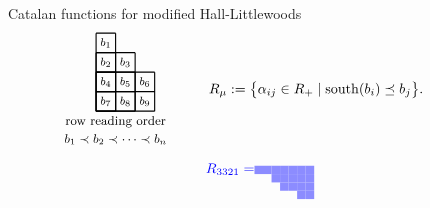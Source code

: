 \documentclass[dvipsnames]{beamer}
\newcommand{\south}{{\mathrm{south}}}
\theoremstyle{definition}
\newcommand{\qtrootcolor}{blue!45}
\newcommand{\colorb}[1]{\textcolor{blue}{#1}}
\begin{document}
\begin{frame}{Catalan functions for modified Hall-Littlewoods}
\begin{align*}
\quad \ \ \
\begin{tikzpicture}[scale = .49]
\begin{scope}
\draw[thick] (0,0) grid (1,4);
\draw[thick] (0,0) grid (2,3);
\draw[thick] (0,0) grid (3,2);
\node at (0.5, 3.5) { \footnotesize $b_1$};
\node at (0.5, 2.5) { \footnotesize $b_2$};
\node at (1.5, 2.5) { \footnotesize $b_3$};
\node at (0.5, 1.5) { \footnotesize $b_4$};
\node at (1.5, 1.5) { \footnotesize $b_5$};
\node at (2.5, 1.5) { \footnotesize $b_6$};
\node at (0.5, 0.5) { \footnotesize $b_7$};
\node at (1.5, 0.5) { \footnotesize $b_8$};
\node at (2.5, 0.5) { \footnotesize $b_9$};
\node at (1,-.54) {\small row reading order };
\node at (1,-1.44) {\small $b_1 \prec b_2 \prec \cdots  \prec b_n$};
\end{scope}
\end{tikzpicture}
\quad  \quad \ \
\raisebox{14mm}{\parbox{7cm}{
$R_\mu  :=  \big\{ \alpha_{ij} \in R_+ \mid  \south(b_i) \preceq b_j \big\}$.}}
\end{align*}
\vspace{-1cm}
\begin{align*}
\raisebox{6.7mm}{$\colorb{R_{3321} = }$}
\begin{tikzpicture}[scale=.213]
\draw[draw = none, fill = \qtrootcolor] (2,-1) rectangle (3,-2);
 \draw[draw = none, fill = \qtrootcolor] (3,-1) rectangle (4,-2);
 \draw[draw = none, fill = \qtrootcolor] (4,-1) rectangle (5,-2);
 \draw[draw = none, fill = \qtrootcolor] (4,-2) rectangle (5,-3);
 \draw[draw = none, fill = \qtrootcolor] (5,-1) rectangle (6,-2);
 \draw[draw = none, fill = \qtrootcolor] (5,-2) rectangle (6,-3);
 \draw[draw = none, fill = \qtrootcolor] (5,-3) rectangle (6,-4);
 \draw[draw = none, fill = \qtrootcolor] (6,-1) rectangle (7,-2);
 \draw[draw = none, fill = \qtrootcolor] (6,-2) rectangle (7,-3);
 \draw[draw = none, fill = \qtrootcolor] (6,-3) rectangle (7,-4);
 \draw[draw = none, fill = \qtrootcolor] (7,-1) rectangle (8,-2);
 \draw[draw = none, fill = \qtrootcolor] (7,-2) rectangle (8,-3);
 \draw[draw = none, fill = \qtrootcolor] (7,-3) rectangle (8,-4);
 \draw[draw = none, fill = \qtrootcolor] (7,-4) rectangle (8,-5);
 \draw[draw = none, fill = \qtrootcolor] (8,-1) rectangle (9,-2);
 \draw[draw = none, fill = \qtrootcolor] (8,-2) rectangle (9,-3);
 \draw[draw = none, fill = \qtrootcolor] (8,-3) rectangle (9,-4);
 \draw[draw = none, fill = \qtrootcolor] (8,-4) rectangle (9,-5);

\end{tikzpicture}
\end{align*}
\end{frame}
\end{document}
